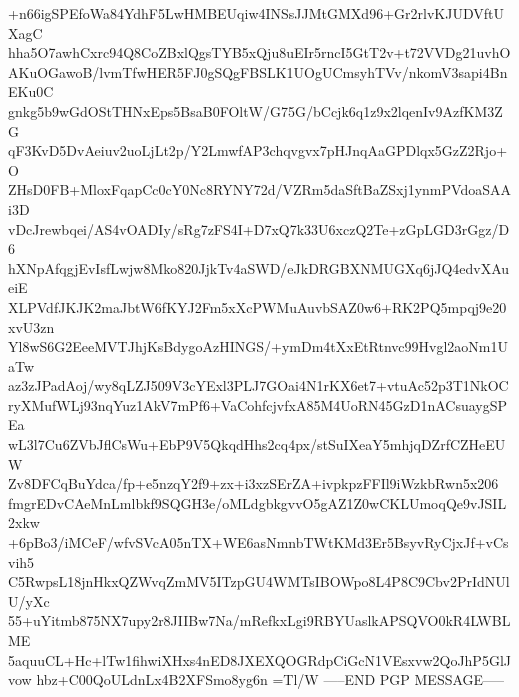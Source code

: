 +n66igSPEfoWa84YdhF5LwHMBEUqiw4INSsJJMtGMXd96+Gr2rlvKJUDVftUXagC
hha5O7awhCxrc94Q8CoZBxlQgsTYB5xQju8uEIr5rncI5GtT2v+t72VVDg21uvhO
AKuOGawoB/lvmTfwHER5FJ0gSQgFBSLK1UOgUCmsyhTVv/nkomV3sapi4BnEKu0C
gnkg5b9wGdOStTHNxEps5BsaB0FOltW/G75G/bCcjk6q1z9x2lqenIv9AzfKM3ZG
qF3KvD5DvAeiuv2uoLjLt2p/Y2LmwfAP3chqvgvx7pHJnqAaGPDlqx5GzZ2Rjo+O
ZHsD0FB+MloxFqapCc0cY0Nc8RYNY72d/VZRm5daSftBaZSxj1ynmPVdoaSAAi3D
vDcJrewbqei/AS4vOADIy/sRg7zFS4I+D7xQ7k33U6xczQ2Te+zGpLGD3rGgz/D6
hXNpAfqgjEvIsfLwjw8Mko820JjkTv4aSWD/eJkDRGBXNMUGXq6jJQ4edvXAueiE
XLPVdfJKJK2maJbtW6fKYJ2Fm5xXcPWMuAuvbSAZ0w6+RK2PQ5mpqj9e20xvU3zn
Yl8wS6G2EeeMVTJhjKsBdygoAzHINGS/+ymDm4tXxEtRtnvc99Hvgl2aoNm1UaTw
az3zJPadAoj/wy8qLZJ509V3cYExl3PLJ7GOai4N1rKX6et7+vtuAc52p3T1NkOC
ryXMufWLj93nqYuz1AkV7mPf6+VaCohfcjvfxA85M4UoRN45GzD1nACsuaygSPEa
wL3l7Cu6ZVbJflCsWu+EbP9V5QkqdHhs2cq4px/stSuIXeaY5mhjqDZrfCZHeEUW
Zv8DFCqBuYdca/fp+e5nzqY2f9+zx+i3xzSErZA+ivpkpzFFIl9iWzkbRwn5x206
fmgrEDvCAeMnLmlbkf9SQGH3e/oMLdgbkgvvO5gAZ1Z0wCKLUmoqQe9vJSIL2xkw
+6pBo3/iMCeF/wfvSVcA05nTX+WE6asNmnbTWtKMd3Er5BsyvRyCjxJf+vCsvih5
C5RwpsL18jnHkxQZWvqZmMV5ITzpGU4WMTsIBOWpo8L4P8C9Cbv2PrIdNUlU/yXc
55+uYitmb875NX7upy2r8JIIBw7Na/mRefkxLgi9RBYUaslkAPSQVO0kR4LWBLME
5aquuCL+Hc+lTw1fihwiXHxs4nED8JXEXQOGRdpCiGcN1VEsxvw2QoJhP5GlJvow
hbz+C00QoULdnLx4B2XFSmo8yg6n
=Tl/W
-----END PGP MESSAGE-----
